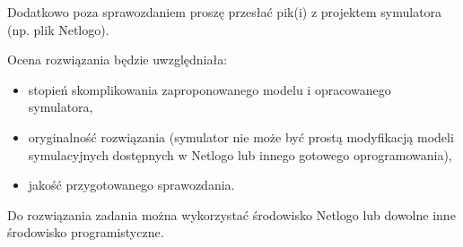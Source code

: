 \documentclass[a4paper,11pt,titlepage]{article}
\begin{document}
Dodatkowo poza sprawozdaniem proszę przesłać pik(i) z projektem symulatora (np. plik Netlogo).

Ocena rozwiązania będzie uwzględniała:
\begin{itemize}
\item stopień skomplikowania zaproponowanego modelu i opracowanego symulatora,
\item oryginalność rozwiązania (symulator nie może być prostą modyfikacją modeli symulacyjnych dostępnych w Netlogo lub innego gotowego oprogramowania),
\item jakość przygotowanego sprawozdania.
\end{itemize}

Do rozwiązania zadania można wykorzystać środowisko Netlogo lub dowolne inne środowisko programistyczne.
\end{document}
